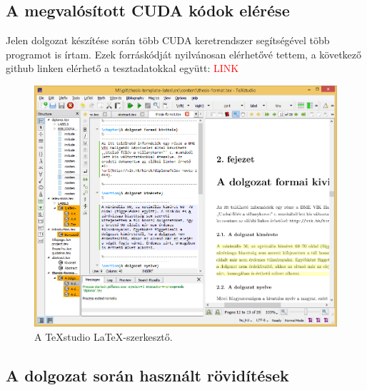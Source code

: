 \appendix
\chapter*{\fuggelek}
\setcounter{chapter}{\appendixnumber}
\section{A megvalósított CUDA kódok elérése}
Jelen dolgozat készítése során több CUDA keretrendszer segítségével több programot is írtam. Ezek forráskódját nyilvánosan elérhetővé tettem, a következő github linken elérhető a tesztadatokkal együtt: \textcolor{red}{LINK} 
\begin{figure}[!ht]
\centering
\includegraphics[width=150mm, keepaspectratio]{figures/TeXstudio.png}
\caption{A TeXstudio \LaTeX-szerkesztő.} 
\end{figure}


\clearpage\section{A dolgozat során használt rövidítések}

